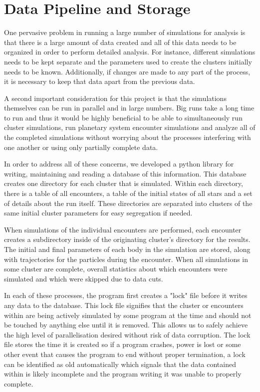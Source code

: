 \documentclass[12pt]{article}
\begin{document}


\section{Data Pipeline and Storage}

    One pervasive problem in running a large number of simulations for analysis is
    that there is a large amount of data created and all of this data needs to be
    organized in order to perform detailed analysis. For instance, different simulations
    needs to be kept separate and the parameters used to create the clusters initially
    needs to be known. Additionally, if changes are made to any part of the process, it
    is necessary to keep that data apart from the previous data.

    A second important consideration for this project is that the simulations themselves
    can be run in parallel and in large numbers. Big runs take a long time to run
    and thus it would be highly beneficial to be able to simultaneously run cluster
    simulations, run planetary system encounter simulations and analyze all of the
    completed simulations without worrying about the processes interfering with one
    another or using only partially complete data.

    In order to address all of these concerns, we developed a python library 
    for writing, maintaining and reading a database of this information. This database
    creates one directory for each cluster that is simulated. Within each directory,
    there is a table of all encounters, a table of the initial states of all stars
    and a set of details about the run itself. These directories are separated
    into clusters of the same initial cluster parameters for easy segregation if needed.

    When simulations of the individual encounters are performed, each encounter
    creates a subdirectory inside of the originating cluster's directory for the 
    results. 
    The initial and final parameters of each body in the simulation are stored, along
    with trajectories for the particles during the encounter. When all simulations
    in some cluster are complete, overall statistics about which encounters were
    simulated and which were skipped due to data cuts.

    In each of these processes, the program first creates a "lock" file before it
    writes any data to the database. This lock file signifies that the cluster or
    encounters within are being actively simulated by some program at the time and
    should not be touched by anything else until it is removed. This allows us to
    safely achieve the high level of parallelisation desired without risk of data
    corruption. The lock file stores the time it is created so if a program
    crashes, power is lost or some other event that causes the program to end without
    proper termination, a lock can be identified as old automatically which 
    signals that the data contained within is likely incomplete and the program
    writing it was unable to properly complete.
\end{document}

